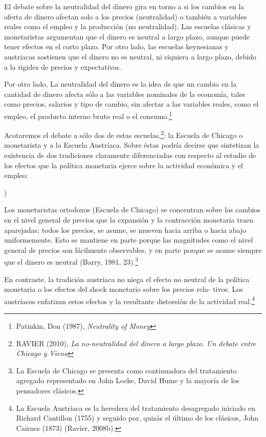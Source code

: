 \documentclass[10pt,a4paper]{article}
\newcounter{alphaitem}
\newenvironment{la}
      {\begin{list}{\alph{alphaitem})}{%
          \usecounter{alphaitem}%
          \setlength{\leftmargin}{1cm}%
          \setlength{\parskip}{3pt}%
          \setlength{\itemsep}{0pt}%
          \setlength{\parsep}{0pt}%
      }}
      {\end{list}}
\begin{document}
El debate sobre la neutralidad del dinero gira en torno a si los cambios en la oferta de dinero afectan solo a los precios (neutralidad) o también a variables reales como el empleo y la producción (no neutralidad). Las escuelas clásicas y monetaristas argumentan que el dinero es neutral a largo plazo, aunque puede tener efectos en el corto plazo. Por otro lado, las escuelas keynesianas y austriacas sostienen que el dinero no es neutral, ni siquiera a largo plazo, debido a la rigidez de precios y expectativas. 

Por otro lado, La neutralidad del dinero es la idea de que un cambio en la cantidad de dinero afecta sólo a las variables nominales de la economía, tales como precios, salarios y tipo de cambio, sin afectar a las variables reales, como el empleo, el producto interno bruto real o el consumo.\footnote{Patinkin, Don (1987), \textit{Neutrality of Money}}

Acotaremos el debate a sólo dos de estas escuelas,\footnote{%
    RAVIER (2010), \textit{La no-neutralidad del dinero a largo plazo. Un debate entre Chicago y Viena}
}: la Escuela de Chicago o monetarista y a la Escuela Austríaca. Sobre éstas podría decirse que sintetizan la existencia de dos tradiciones claramente diferenciadas con respecto al estudio de los efectos que la política monetaria ejerce sobre la actividad económica y el empleo:
\begin{la}
    \item Los monetaristas ortodoxos (Escuela de Chicago) se concentran sobre los cambios en el nivel general de precios que la expansión y la contracción monetaria traen aparejadas; todos los precios, se asume, se mueven hacia arriba o hacia abajo uniformemente. Esto se mantiene en parte porque las magnitudes como el nivel general de precios son fácilmente observables, y en parte porque se asume siempre que el dinero es neutral (Barry, 1981, 23).\footnote{%
        La Escuela de Chicago se presenta como continuadora del tratamiento agregado representado en John Locke, David Hume y la mayoría de los pensadores clásicos.
    }
    \item En contraste, la tradición austríaca no niega el efecto no neutral de la política monetaria o los efectos del shock monetario sobre los precios rela- tivos. Los austríacos enfatizan estos efectos y la resultante distorsión de la actividad real.\footnote{%
        La Escuela Austríaca es la heredera del tratamiento desagregado iniciado en Richard Cantillon (1755) y seguido por, quizás el último de los clásicos, John Cairnes (1873) (Ravier, 2008b).
    }
\end{la}  
\end{document}
